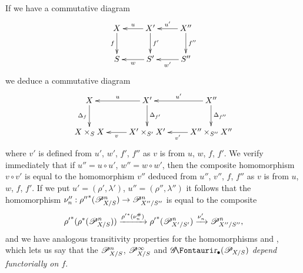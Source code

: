 \begin{env}[16.4.2]
\label{IV.16.4.2}
If we have a commutative diagram
\[
  \xymatrix{
    X \ar[d]_-{f} & X' \ar[l]_-u \ar[d]^-{f'} & X'' \ar[l]_-{u'} \ar[d]^-{f''}\\
    S & S' \ar[l]^-w & S'' \ar[l]^-{w'} 
  }
\]
we deduce a commutative diagram
\[
  \xymatrix{
    X \ar[d]_-{\Delta_f} & X' \ar[l]_-u \ar[d]^-{\Delta_{f'}} & X'' \ar[l]_-{u'} \ar[d]^-{\Delta_{f''}}\\
    X \times_S X & X' \times_{S'} X' \ar[l]^-v & X'' \times_{S''} X'' \ar[l]^-{v'}
  }
\]
where $v'$ is defined from $u'$, $w'$, $f'$, $f''$ as $v$ is from $u$, $w$, $f$, $f'$.
We verify immediately that if $u'' = u \circ u'$, $w'' = w \circ w'$, then the composite homomorphism $v \circ v'$ is equal to the homomorphism $v''$ deduced from $u''$, $v''$, $f$, $f''$ as $v$ is from $u$, $w$, $f$, $f'$.
If we put $u' = (\rho', \lambda')$, $u'' = (\rho'', \lambda'')$ it follows  that the homomorphism $\nu''_n: {\rho''}^*(\sh{P}_{X/S}^n) \to \sh{P}_{X''/S''}^n$ is equal to the composite
\[
  {\rho'}^*(\rho^*(\mathscr{P}_{X/S}^n)) \xrightarrow{{\rho'}^*(\nu_n^\#)} {\rho'}^*(\mathscr{P}_{X'/S'}^n) \xrightarrow{\nu'_n} \mathscr{P}_{X''/S''}^n,
\]
and we have analogous transitivity properties for the homomorphisms  and , which lets us say that the $\mathscr{P}_{X/S}^n$, $\mathscr{P}_{X/S}^\infty$ and $\shGr_\bullet(\sh{P}_{X/S})$ \emph{depend functorially on $f$}. 
\end{env}

